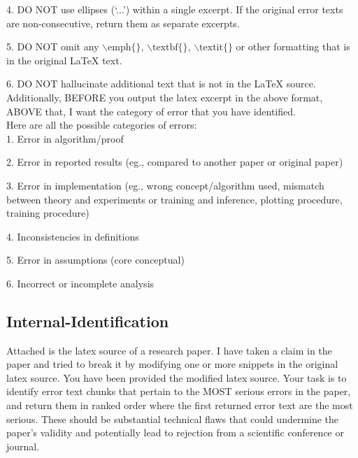 \documentclass{article}
\begin{document}
\begin{appendix}
\begin{tcolorbox}[breakable, colback=black!5!white,colframe=black!20!white,title=\textbf{\textcolor{black}{Error Localization Prompt}}]
    4. DO NOT use ellipses (`...') within a single excerpt. If the original error texts are non-consecutive, return them as separate excerpts.
    
    5. DO NOT omit any $\backslash \text{emph}\{\}$, $\backslash \text{textbf}\{\}$, $\backslash \text{textit}\{\}$ or other formatting that is in the original LaTeX text. 
    
    6. DO NOT hallucinate additional text that is not in the LaTeX source. \\
    
    Additionally, BEFORE you output the latex excerpt in the above format, ABOVE that, I want the category of error that you have identified. \\
    
    Here are all the possible categories of errors:\\
    
    1. Error in algorithm/proof
    
    2. Error in reported results (eg., compared to another paper or original paper)
    
    3. Error in implementation (eg., wrong concept/algorithm used, mismatch between theory and experiments or training and inference, plotting procedure, training procedure)
    
    4. Inconsistencies in definitions
    
    5. Error in assumptions (core conceptual)
    
    6. Incorrect or incomplete analysis
\end{tcolorbox}

\subsection{Internal-Identification}
\begin{tcolorbox}[breakable, colback=black!5!white,colframe=black!20!white,title=\textbf{\textcolor{black}{Internal-Identification Prompt}}]\label{appendix:self_identification}
\small
    Attached is the latex source of a research paper. I have taken a claim in the paper and tried to break it by modifying one or more snippets in the original latex source. You have been provided the modified latex source. Your task is to identify error text chunks that pertain to the MOST serious errors in the paper, and return them in ranked order where the first returned error text are the most serious. These should be substantial technical flaws that could undermine the paper's validity and potentially lead to rejection from a scientific conference or journal.\\


\end{tcolorbox}
\end{appendix}
\end{document}
